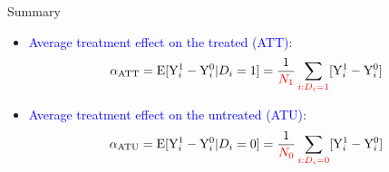\documentclass[hyperref={pdfpagelabels=false}]{beamer}
\begin{document}
\begin{frame}{Summary}
	\begin{itemize}	
		\item \textcolor{blue} {Average treatment effect on the treated (ATT)}:
		\begin{equation*}
			\alpha_{\text{ATT}} =  \mathrm{E}[\mathrm{Y}^{1}_{i}-\mathrm{Y}^{0}_{i}|D_i=1] = \dfrac{1}{\color{red}N_1} \sum_{\color{red}i:D_i=1}[\mathrm{Y}^{1}_{i}-\mathrm{Y}^{0}_{i}]
		\end{equation*}
		
		
		\item \textcolor{blue} {Average treatment effect on the untreated (ATU)}:
		\begin{equation*}
			\alpha_{\text{ATU}} =  \mathrm{E}[\mathrm{Y}^{1}_{i}-\mathrm{Y}^{0}_{i}|D_i=0] = \dfrac{1}{\color{red}N_0} \sum_{\color{red}i:D_i=0}[\mathrm{Y}^{1}_{i}-\mathrm{Y}^{0}_{i}]
		\end{equation*}
		
	\end{itemize}
	
\end{frame}
\end{document}
